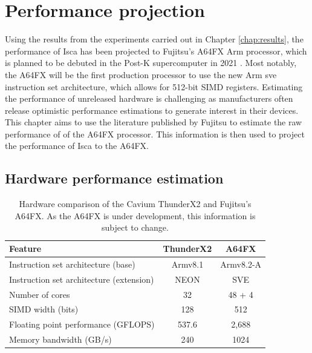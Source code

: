 \documentclass[a4paper,11pt]{report}
\begin{document}
%
%
\chapter{Performance projection}
Using the results from the experiments carried out in Chapter \ref{chap:results}, the performance of Isca has been projected to Fujitsu's A64FX Arm processor, which is planned to be debuted in the Post-K supercomputer in 2021 \cite{yoshida2018fujitsu}. Most notably, the A64FX will be the first production processor to use the new Arm \gls{sve} instruction set architecture, which allows for 512-bit SIMD registers. Estimating the performance of unreleased hardware is challenging as manufacturers often release optimistic performance estimations to generate interest in their devices. This chapter aims to use the literature published by Fujitsu to estimate the raw performance of of the A64FX processor. This information is then used to project the performance of Isca to the A64FX.

\section{Hardware performance estimation}


\begin{table}[htp]
\caption{Hardware comparison of the Cavium ThunderX2 and Fujitsu's A64FX. As the A64FX is under development, this information is subject to change.}
\begin{center}
\begin{tabular}{lcc}
\toprule
\textbf{Feature} 					& \textbf{ThunderX2} & \textbf{A64FX}	\\ \midrule
Instruction set architecture (base)		& Armv8.1			& Armv8.2-A		\\
Instruction set architecture (extension) 	& NEON			& SVE			\\
Number of cores 					& 32				& 48 + 4			\\
SIMD width (bits)					& 128			& 512			\\
Floating point performance (GFLOPS)	& 537.6			& 2,688			\\
Memory bandwidth (GB/s)				& 240			& 1024			\\


\bottomrule


\end{tabular}
\end{center}
\label{table:armcomp}
\end{table}%
\end{document}
